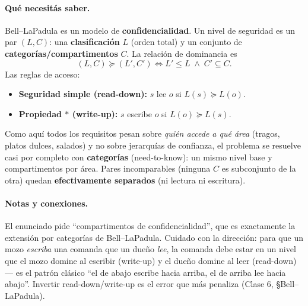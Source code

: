 \paragraph{Qué necesitás saber.} Bell--LaPadula es un modelo de \textbf{confidencialidad}.
Un nivel de seguridad es un par $(L,C)$: una \textbf{clasificación} $L$ (orden total) y un
conjunto de \textbf{categorías/compartimentos} $C$. La relación de dominancia es
\begin{equation}
  (L,C) \succeq (L',C') \iff L' \le L \;\wedge\; C' \subseteq C .
\end{equation}
Las reglas de acceso:
\begin{itemize}
  \item \textbf{Seguridad simple (read-down):} $s$ lee $o$ si $L(s) \succeq L(o)$.
  \item \textbf{Propiedad $\ast$ (write-up):} $s$ escribe $o$ si $L(o) \succeq L(s)$.
\end{itemize}
Como aquí todos los requisitos pesan sobre \emph{quién accede a qué área} (tragos, platos
dulces, salados) y no sobre jerarquías de confianza, el problema se resuelve casi por
completo con \textbf{categorías} (need-to-know): un mismo nivel base y compartimentos por
área. Pares incomparables (ninguna $C$ es subconjunto de la otra) quedan
\textbf{efectivamente separados} (ni lectura ni escritura).

\paragraph{Notas y conexiones.} El enunciado pide ``compartimentos de confidencialidad'',
que es exactamente la extensión por categorías de Bell--LaPadula. Cuidado con la dirección:
para que un mozo \emph{escriba} una comanda que un dueño \emph{lee}, la comanda debe estar en
un nivel que el mozo domine al escribir (write-up) y el dueño domine al leer (read-down) — es
el patrón clásico ``el de abajo escribe hacia arriba, el de arriba lee hacia abajo''. Invertir
read-down/write-up es el error que más penaliza (Clase 6, \S Bell--LaPadula).


